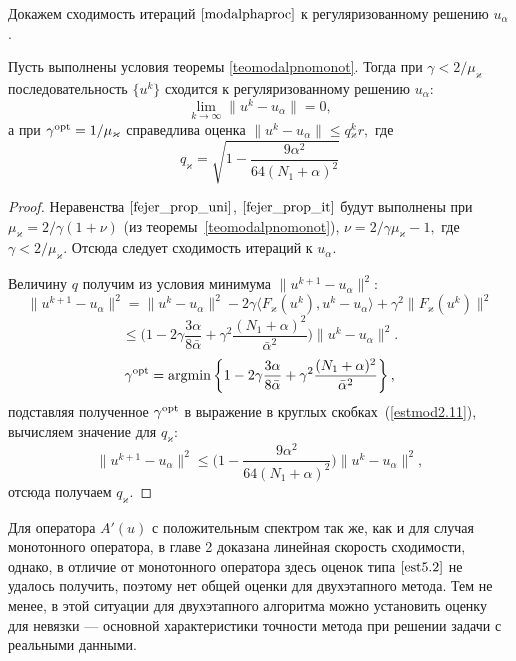 Докажем сходимость итераций $\eqref{modalphaproc}$ к регуляризованному решению $u_\alpha$.
\begin{theorem}
	Пусть выполнены условия теоремы \ref{teomodalpnomonot}. Тогда при $\gamma < 2/\mu_\varkappa$ последовательность $\{u^k\}$ сходится к регуляризованному решению $u_\alpha$: $$\lim\limits_{k\to\infty}\|u^k-u_\alpha\|=0,$$ а при $\gamma^{\textnormal{opt}}=1/\mu_\varkappa$ справедлива оценка $\|u^k-u_\alpha\|\le q{_\varkappa^k}r,$ где
	$$q_\varkappa=\sqrt{1-\frac{9\alpha^2}{64(N_1+\alpha)^2}}$$
\end{theorem}
\begin{proof} Неравенства $\eqref{fejer_prop_uni}$, $\eqref{fejer_prop_it}$ будут выполнены при $\mu_\varkappa={2}/{\gamma(1+\nu)}$ (из теоремы~\ref{teomodalpnomonot}), $\nu={2}/{\gamma\mu_\varkappa}-1,$ где $\gamma<2/\mu_\varkappa$. Отсюда следует сходимость итераций к $u_\alpha$.

Величину $q$ получим из условия минимума $\|u^{k+1}-u_\alpha\|^2$:
$$\|u^{k+1}-u_\alpha\|^2=\|u^k-u_\alpha\|^2-2\gamma\langle F_\varkappa(u^k), u^k-u_\alpha\rangle+\gamma^2\|F_\varkappa(u^k)\|^2$$
\begin{equation}\label{estmod2.11}
\le\big(1-2\gamma\frac{3\alpha}{8\bar{\alpha}}+\gamma^2\frac{(N_1+\alpha)^2}{\bar{\alpha}^2}\big)\|u^k-u_\alpha\|^2.
\end{equation}
$$\gamma^{\textnormal{opt}}=\textnormal{argmin}\left \{1-2\gamma\frac{3\alpha}{8\bar{\alpha}}+\gamma^2\frac{(N_1+\alpha)^2}{\bar{\alpha}^2}\right \},$$
подставляя полученное $\gamma^{\textnormal{opt}}$ в выражение в круглых скобках~(\ref{estmod2.11}), вычисляем значение для $q_\varkappa$:
$$\|u^{k+1}-u_\alpha\|^2\le\big(1-\frac{9\alpha^2}{64(N_1+\alpha)^2}\big)\|u^k-u_\alpha\|^2,$$ отсюда получаем $q_\varkappa$.
\end{proof}

Для оператора $A'(u)$ с положительным спектром так же, как и для случая монотонного оператора, в главе 2 доказана линейная скорость сходимости, однако, в отличие от монотонного оператора здесь оценок типа $\eqref{est5.2}$ не удалось получить, поэтому нет общей оценки для двухэтапного метода. Тем не менее, в этой ситуации для двухэтапного алгоритма можно установить оценку для невязки --- основной характеристики точности метода при решении задачи с реальными данными.

